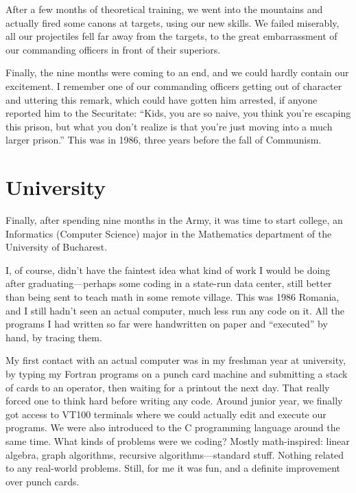 \documentclass[12pt]{book}
\begin{document}
After a few months of theoretical training, we went into the mountains
and actually fired some canons at targets, using our new skills. We
failed miserably, all our projectiles fell far away from the targets, to
the great embarrassment of our commanding officers in front of their
superiors.

Finally, the nine months were coming to an end, and we could hardly
contain our excitement. I remember one of our commanding officers
getting out of character and uttering this remark, which could have
gotten him arrested, if anyone reported him to the Securitate: ``Kids,
you are so naive, you think you're escaping this prison, but what you
don't realize is that you're just moving into a much larger prison.''
This was in 1986, three years before the fall of Communism.


\section{University}

Finally, after spending nine months in the Army, it was time to start
college, an Informatics (Computer Science) major in the Mathematics
department of the University of Bucharest.

I, of course, didn't have the faintest idea what kind of work I would be
doing after graduating---perhaps some coding in a state-run data center,
still better than being sent to teach math in some remote village. This
was 1986 Romania, and I still hadn't seen an actual computer, much less
run any code on it. All the programs I had written so far were
handwritten on paper and ``executed'' by hand, by tracing them.

My first contact with an actual computer was in my freshman year at
university, by typing my Fortran programs on a punch card machine and
submitting a stack of cards to an operator, then waiting for a printout
the next day. That really forced one to think hard before writing any
code. Around junior year, we finally got access to VT100 terminals where
we could actually edit and execute our programs. We were also introduced
to the C programming language around the same time. What kinds of
problems were we coding? Mostly math-inspired: linear algebra, graph
algorithms, recursive algorithms---standard stuff. Nothing related to
any real-world problems. Still, for me it was fun, and a definite
improvement over punch cards.
\end{document}
